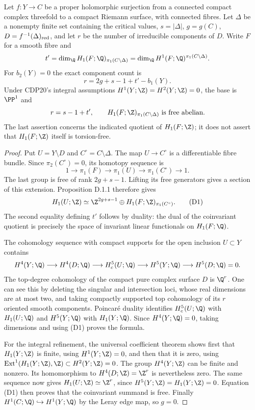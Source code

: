 \begin{proposition}[D.1.2; Proved]\label{st:D.1.2}
Let $f:Y\to C$ be a proper holomorphic surjection from a connected
compact complex threefold to a compact Riemann surface, with
connected fibres. Let $\Delta$ be a nonempty finite set containing
the critical values, $s=|\Delta|$, $g=g(C)$,
$D=f^{-1}(\Delta)_{\rm red}$, and let $r$ be the number of
irreducible components of $D$. Write $F$ for a smooth fibre and
\[
t'=\dim_{\Q}H_1(F;\Q)_{\pi_1(C\setminus\Delta)}
   =\dim_{\Q}H^1(F;\Q)^{\pi_1(C\setminus\Delta)}.
\]
For $b_2(Y)=0$ the exact component count is
\[
\boxed{\quad r=2g+s-1+t'-b_1(Y).\quad}
\]
Under CDP20's integral assumptions
$H^1(Y;\Z)=H^2(Y;\Z)=0$, the base is $\PP^1$ and
\[
r=s-1+t',\qquad
H_1(F;\Z)_{\pi_1(C\setminus\Delta)}\text{ is free abelian}.
\]
The last assertion concerns the indicated quotient of $H_1(F;\Z)$;
it does not assert that $H_1(F;\Z)$ itself is torsion-free.
\end{proposition}
\begin{proof}
Put $U=Y\setminus D$ and $C^\circ=C\setminus\Delta$.
The map $U\to C^\circ$ is a differentiable fibre bundle. Since
$\pi_2(C^\circ)=0$, its homotopy sequence is
\[
1\longrightarrow\pi_1(F)\longrightarrow\pi_1(U)
 \longrightarrow\pi_1(C^\circ)\longrightarrow1.
\]
The last group is free of rank $2g+s-1$. Lifting its free generators
gives a section of this extension. Proposition D.1.1 therefore gives
\[
H_1(U;\Z)\simeq
\Z^{2g+s-1}\oplus H_1(F;\Z)_{\pi_1(C^\circ)}.       \tag{D1}
\]
The second equality defining $t'$ follows by duality: the dual of
the coinvariant quotient is precisely the space of invariant
linear functionals on $H_1(F;\Q)$.

The cohomology sequence with compact supports for the open inclusion
$U\subset Y$ contains
\[
H^4(Y;\Q)\longrightarrow H^4(D;\Q)
\longrightarrow H_c^5(U;\Q)
\longrightarrow H^5(Y;\Q)\longrightarrow H^5(D;\Q)=0.
\]
The top-degree cohomology of the compact pure complex surface $D$
is $\Q^r$. One can see this by deleting the singular and intersection
loci, whose real dimensions are at most two, and taking compactly
supported top cohomology of its $r$ oriented smooth components.
Poincar\'e duality identifies $H_c^5(U;\Q)$ with $H_1(U;\Q)$ and
$H^5(Y;\Q)$ with $H_1(Y;\Q)$. Since $H^4(Y;\Q)=0$, taking
dimensions and using (D1) proves the formula.

For the integral refinement, the universal coefficient theorem shows
first that $H_1(Y;\Z)$ is finite, using $H^1(Y;\Z)=0$, and then that
it is zero, using
$\operatorname{Ext}^1(H_1(Y;\Z),\Z)\subset H^2(Y;\Z)=0$.
The group $H^4(Y;\Z)$ can be finite and nonzero. Its homomorphism
to $H^4(D;\Z)=\Z^r$ is nevertheless zero. The same sequence now
gives $H_1(U;\Z)\simeq\Z^r$, since $H^5(Y;\Z)=H_1(Y;\Z)=0$.
Equation (D1) then proves that the coinvariant summand is free.
Finally $H^1(C;\Q)\hookrightarrow H^1(Y;\Q)$ by the Leray edge
map, so $g=0$.
\end{proof}

